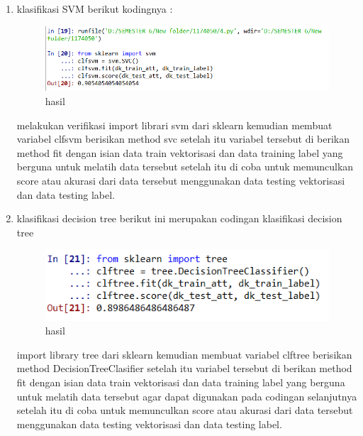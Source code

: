 \begin{enumerate}
\item klasifikasi SVM
 berikut kodingnya :

\begin{figure}[ht]
\centering
\includegraphics[scale=0.5]{figures/1174050/chapter4/9.PNG}
\caption{hasil}
\label{Praktek no 4}
\end{figure}
melakukan verifikasi import librari svm dari sklearn kemudian membuat variabel clfsvm berisikan method svc setelah itu variabel tersebut di berikan method fit dengan isian data train vektorisasi dan data training label yang berguna untuk melatih data tersebut setelah itu di coba untuk memunculkan score atau akurasi dari data tersebut menggunakan data testing vektorisasi dan data testing label.

\item klasifikasi decision tree 
berikut ini merupakan codingan klasifikasi decision tree

\begin{figure}[ht]
\centering
\includegraphics[scale=0.5]{figures/1174050/chapter4/10.PNG}
\caption{hasil}
\label{Praktek no 5}
\end{figure}
import library tree dari sklearn kemudian membuat variabel clftree berisikan method DecisionTreeClasifier setelah itu variabel tersebut di berikan method fit dengan isian data train vektorisasi dan data training label yang berguna untuk melatih data tersebut agar dapat digunakan pada codingan selanjutnya setelah itu di coba untuk memunculkan score atau akurasi dari data tersebut menggunakan data testing vektorisasi dan data testing label.


\end{enumerate}
